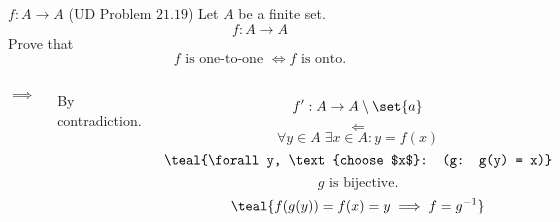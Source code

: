 \begin{frame}{}
  \begin{exampleblock}{$f: A \to A$ (UD Problem $21.19$)}
    Let $A$ be a finite set.
    \[
      f: A \to A
    \]
    Prove that 
    \[
      f \text{ is one-to-one } \iff f \text{ is onto}.
    \]
  \end{exampleblock}

  \pause
  \vspace{0.60cm}
  \begin{columns}
      \[
	\implies
      \]
      \centerline{By contradiction.}
      \pause 
      \[
	f': A \to A \setminus \set{a}
      \]
      \pause
      \[
	\Longleftarrow
      \]
      \pause \vspace{-0.30cm}
      \[
	\forall y \in A\; \exists x \in A: y = f(x)
      \]
      \pause \vspace{-0.30cm}
      \[
	\teal{\forall y, \text{choose $x$}: (g: g(y) = x)}
      \]
      \pause \vspace{-0.30cm}
      \[
	g \text{ is bijective.}
      \]
      \pause \vspace{-0.30cm}
      \[
	\teal{f(g(y)) = f(x) = y \implies f = g^{-1}}
      \]
  \end{columns}
\end{frame}
